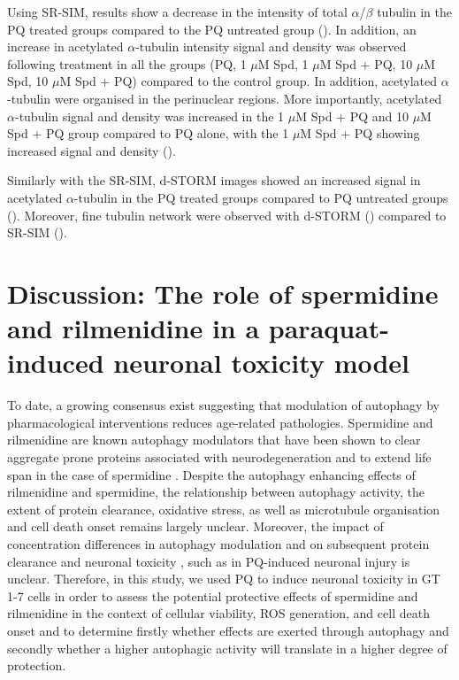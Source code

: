 Using SR-SIM, results show a decrease in the intensity of total $\alpha$/$\beta$ tubulin in the PQ treated groups compared to the PQ untreated group (). In addition, an increase in acetylated $\alpha$-tubulin intensity signal and density was observed following treatment in all the groups (PQ, 1 $\mu$M Spd, 1 $\mu$M Spd + PQ, 10 $\mu$M Spd, 10 $\mu$M Spd + PQ) compared to the control group. In addition, acetylated $\alpha$-tubulin were organised in the perinuclear regions. More importantly, acetylated $\alpha$-tubulin signal and density was increased in the 1 $\mu$M Spd + PQ and 10 $\mu$M Spd + PQ group compared to PQ alone, with the 1 $\mu$M Spd + PQ showing increased signal and density (). 

Similarly with the SR-SIM, d-STORM images showed an increased signal in acetylated $\alpha$-tubulin in the PQ treated groups compared to PQ untreated groups (). Moreover, fine tubulin network were observed with d-STORM () compared to SR-SIM ().

\section{Discussion: The role of spermidine and rilmenidine in a paraquat-induced neuronal toxicity model}
To date, a growing consensus exist suggesting that modulation of autophagy by pharmacological interventions reduces age-related pathologies. Spermidine and rilmenidine are known autophagy modulators that have been shown to clear aggregate prone proteins associated with neurodegeneration \citep{Bhukel2017,Buttner2014,Rose2010,Sigrist2014} and to extend life span in the case of spermidine \citep{Madeo2010,Morselli2009}. Despite the autophagy enhancing effects of rilmenidine and spermidine, the relationship between autophagy activity, the extent of protein clearance, oxidative stress, as well as microtubule organisation and cell death onset remains largely unclear. Moreover, the impact of concentration differences in autophagy modulation and on subsequent protein clearance and neuronal toxicity , such as in PQ-induced neuronal injury is unclear. Therefore, in this study, we used PQ to induce neuronal toxicity in GT 1-7 cells in order to assess the potential protective effects of spermidine and rilmenidine in the context of cellular viability, ROS generation, and cell death onset and to determine firstly whether effects are exerted through autophagy and secondly whether a higher autophagic activity will translate in a higher degree of protection. 

